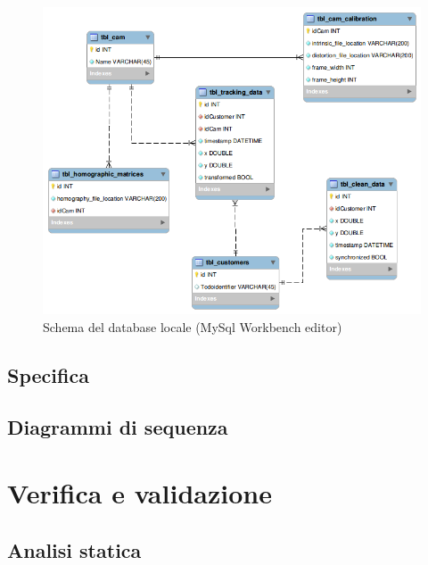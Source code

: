 \documentclass[a4paper,13pt,twoside]{article}
\begin{document}
\begin{figure}[!h]
\centering
\includegraphics[scale=0.5]{./images/dbschema.png}
\caption{Schema del database locale (MySql Workbench editor)}
\label{fig:dbschema}
\end{figure}

\newpage
\subsection{Specifica} \label{sec:specifica}

\subsection{Diagrammi di sequenza} \label{sec:sequenza}

\clearpage

\section{Verifica e validazione} \label{sec:vev}
\subsection{Analisi statica} \label{sec:anstat}

\end{document}

